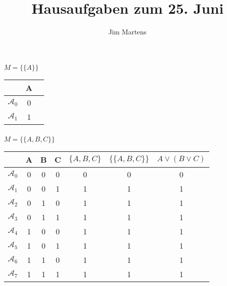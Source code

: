 \documentclass[10pt,a4paper,oneside,ngerman,numbers=noenddot]{scrartcl}
\begin{document}
\author{Jim Martens}
\title{Hausaufgaben zum 25. Juni}
\maketitle

\section{} %
\subsection{} %
\subsubsection{} %
$M = \{\{A\}\}$\\
\begin{tabular}{c|cc}
 & A \\
 \hline
$\mathcal{A}_{0}$ & 0 \\
$\mathcal{A}_{1}$ & 1
\end{tabular}
\subsubsection{} %
$M = \{\{A,B,C\}\}$\\
\begin{tabular}{c|ccc|ccc}
& A & B & C & $\{A,B,C\}$ & $\{\{A,B,C\}\}$ & $A \vee (B \vee C)$\\
\hline
$\mathcal{A}_{0}$ & 0 & 0 & 0 & 0 & 0 & 0 \\
$\mathcal{A}_{1}$ & 0 & 0 & 1 & 1 & 1 & 1 \\
$\mathcal{A}_{2}$ & 0 & 1 & 0 & 1 & 1 & 1\\
$\mathcal{A}_{3}$ & 0 & 1 & 1 & 1 & 1 & 1\\
$\mathcal{A}_{4}$ & 1 & 0 & 0 & 1 & 1 & 1\\
$\mathcal{A}_{5}$ & 1 & 0 & 1 & 1 & 1 & 1\\
$\mathcal{A}_{6}$ & 1 & 1 & 0 & 1 & 1 & 1\\
$\mathcal{A}_{7}$ & 1 & 1 & 1 & 1 & 1 & 1\\
\end{tabular}
\end{document}
